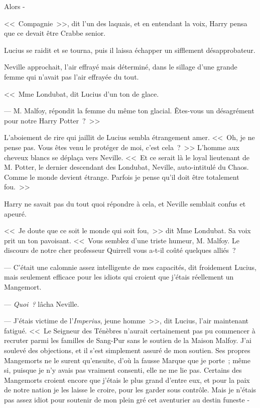 Alors -

<<~Compagnie~>>, dit l'un des laquais, et en entendant la voix, Harry pensa que ce devait être Crabbe senior.

Lucius se raidit et se tourna, puis il laissa échapper un sifflement désapprobateur.

Neville approchait, l'air effrayé mais déterminé, dans le sillage d'une grande femme qui n'avait pas l'air effrayée du tout.

<<~Mme Londubat, dit Lucius d'un ton de glace.

--- M. Malfoy, répondit la femme du même ton glacial. Êtes-vous un désagrément pour notre Harry Potter~?~>>

L'aboiement de rire qui jaillit de Lucius sembla étrangement amer. <<~Oh, je ne pense pas. Vous êtes venu le protéger de moi, c'est cela~?~>> L'homme aux cheveux blancs se déplaça vers Neville. <<~Et ce serait là le loyal lieutenant de M. Potter, le dernier descendant des Londubat, Neville, auto-intitulé du Chaos. Comme le monde devient étrange. Parfois je pense qu'il doit être totalement fou.~>>

Harry ne savait pas du tout quoi répondre à cela, et Neville semblait confus et apeuré.

<<~Je doute que ce soit le monde qui soit fou,~>> dit Mme Londubat. Sa voix prit un ton pavoisant. <<~Vous semblez d'une triste humeur, M. Malfoy. Le discours de notre cher professeur Quirrell vous a-t-il coûté quelques alliés~?

--- C'était une calomnie assez intelligente de mes capacités, dit froidement Lucius, mais seulement efficace pour les idiots qui croient que j'étais réellement un Mangemort.

--- \emph{Quoi~?} lâcha Neville.

--- J'étais victime de l'\emph{Imperius}, jeune homme~>>, dit Lucius, l'air maintenant fatigué. <<~Le Seigneur des Ténèbres n'aurait certainement pas pu commencer à recruter parmi les familles de Sang-Pur sans le soutien de la Maison Malfoy. J'ai soulevé des objections, et il s'est simplement assuré de mon soutien. Ses propres Mangemorts ne le surent qu'ensuite, d'où la fausse Marque que je porte~; même si, puisque je n'y avais pas vraiment consenti, elle ne me lie pas. Certains des Mangemorts croient encore que j'étais le plus grand d'entre eux, et pour la paix de notre nation je les laisse le croire, pour les garder sous contrôle. Mais je n'étais pas assez idiot pour soutenir de mon plein gré cet aventurier au destin funeste -

